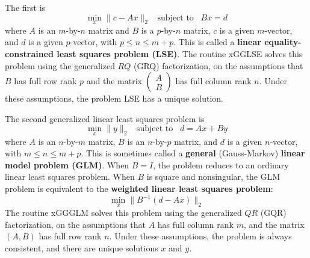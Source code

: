 The first is
\begin{equation}\label{eqnLSE}
\min _{x} \|c - Ax\|_2 \;\;\; \mbox{subject to} \;\;\; B x = d
\end{equation}
where $A$ is an $m$-by-$n$ matrix and $B$ is a $p$-by-$n$ matrix,
$c$ is a given $m$-vector, and $d$ is a given $p$-vector,
with $p \leq n \leq m+p$.
This is
called a {\bf linear equality-constrained least squares problem (LSE)}.
The routine xGGLSE
solves this problem using the generalized $RQ$
(GRQ) factorization, on the
assumptions that $B$ has full row rank $p$ and
the matrix $ \left( \begin{array}{c}
                         A \\
                         B
                   \end{array} \right) $ has full column rank $n$.
Under these assumptions, the problem LSE has a unique solution.

The second generalized linear least squares problem is
\begin{equation}\label{eqnGLM}
\min _{x} \|y\|_2 \;\;\; \mbox{subject to} \;\;\; d = A x + B y
                        \label{glm3}
\end{equation}
where $A$ is an $n$-by-$m$ matrix, $B$ is an $n$-by-$p$ matrix,
and $d$ is a given $n$-vector,
with $m \leq n \leq m+p$.
This is sometimes called a {\bf general} (Gauss-Markov) {\bf linear model problem (GLM)}.
When $B = I$, the problem reduces to an ordinary linear least squares problem.
When $B$ is square and nonsingular, the GLM problem is equivalent to the
{\bf weighted linear least squares problem}:
\[ \min_x \|B^{-1}(d-Ax) \|_2 \]
The routine xGGGLM
solves this problem using the generalized $QR$ (GQR)
factorization, on the
assumptions that $A$ has full column rank $m$, and the
matrix $( A, B )$ has full row rank $n$. Under these assumptions, the
problem is always consistent, and there are unique solutions $x$ and $y$.


